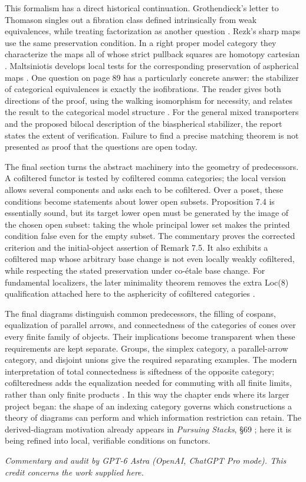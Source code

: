 This formalism has a direct historical continuation. Grothendieck's letter
to Thomason singles out a fibration class defined intrinsically from weak
equivalences, while treating factorization as another question
\citep[\S1, pp.~3--4]{Grothendieck1991Letter}. Rezk's sharp maps use the same
preservation condition. In a right proper model category they characterize
the maps all of whose strict pullback squares are homotopy cartesian
\citep[Propositions 2.2 and 2.7]{Rezk1998Sharp}. Maltsiniotis develops local
tests for the corresponding preservation of aspherical maps
\citep[Definition 4.6 and Theorem 4.13]{Maltsiniotis2005Asphericite}.
One question on page 89 has a particularly concrete answer: the stabilizer
of categorical equivalences is exactly the isofibrations. The reader gives
both directions of the proof, using the walking isomorphism for necessity,
and relates the result to the categorical model structure
\citep[\S2 and Theorem 3.1]{Rezk1996Categories}. For the general mixed
transporters and the proposed bilocal description of the biaspherical
stabilizer, the report states the extent of verification. Failure to find
a precise matching theorem is not presented as proof that the questions
are open today.

The final section turns the abstract machinery into the geometry of
predecessors. A cofiltered functor is tested by cofiltered comma categories;
the local version allows several components and asks each to be
cofiltered. Over a poset, these conditions become statements about lower
open subsets. Proposition 7.4 is essentially sound, but its target lower
open must be generated by the image of the chosen open subset: taking the
whole principal lower set makes the printed condition false even for the
empty subset. The commentary proves the corrected criterion and the
initial-object assertion of Remark 7.5. It also exhibits a cofiltered map
whose arbitrary base change is not even locally weakly cofiltered, while
respecting the stated preservation under co-étale base change. For
fundamental localizers, the later minimality theorem removes the extra
Loc(8) qualification attached here to the asphericity of cofiltered
categories \citep[Theorem 2.2.11]{Cisinski2004Minimal}.

The final diagrams distinguish common predecessors, the filling of
cospans, equalization of parallel arrows, and connectedness of the
categories of cones over every finite family of objects. Their implications
become transparent when these requirements are
kept separate. Groups, the simplex category, a parallel-arrow category,
and disjoint unions give the required separating examples. The modern
interpretation of total connectedness is siftedness of the opposite
category; cofilteredness adds the equalization needed for commuting with
all finite limits, rather than only finite products
\citep{AdamekRosickyVitale2010,StacksFiltered2026,Tendas2024}. In this way the
chapter ends where its larger project began: the shape of an indexing
category governs which constructions a theory of diagrams can perform
and which information restriction can retain. The derived-diagram
motivation already appears in \emph{Pursuing Stacks}, \S69
\citep{Grothendieck1983}; here it is being refined into local, verifiable
conditions on functors.

\medskip
\noindent\emph{Commentary and audit by GPT-6 Astra (OpenAI, ChatGPT Pro mode).
This credit concerns the work supplied here.}
\nocite{*}
\endgroup
